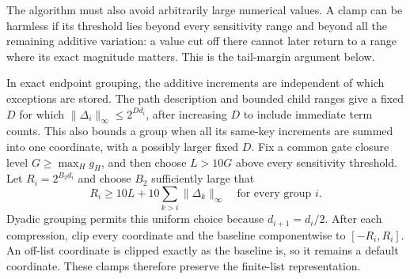The algorithm must also avoid arbitrarily large numerical values. A clamp can be harmless if its threshold lies beyond every sensitivity range and beyond all the remaining additive variation: a value cut off there cannot later return to a range where its exact magnitude matters. This is the tail-margin argument below.

In exact endpoint grouping, the additive increments are independent of
which exceptions are stored.  The path description and bounded child
ranges give a fixed $D$ for which
$\|\Delta_i\|_\infty\leq2^{Dd_i}$, after increasing $D$ to include
immediate term counts.  This also bounds a group when all its same-key
increments are summed into one coordinate, with a possibly larger fixed
$D$.  Fix a common gate closure level $G\ge\max_H g_H$, and then
choose $L>10G$ above every sensitivity threshold.  Let
$R_i=2^{B_2d_i}$ and choose $B_2$ sufficiently large that
\begin{equation}
 R_i\geq 10L+10\sum_{k>i}\|\Delta_k\|_\infty
 \quad\text{for every group }i.
 \label{eq:buf-clamp-margin}
\end{equation}
Dyadic grouping permits this uniform choice because $d_{i+1}=d_i/2$.
After each compression, clip every coordinate and the baseline
componentwise to $[-R_i,R_i]$.
An off-list coordinate is clipped exactly as the baseline is, so it
remains a default coordinate.  These clamps therefore preserve the
finite-list representation.

